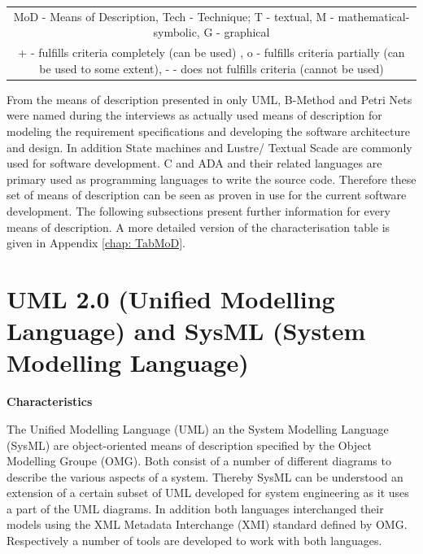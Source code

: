 \documentclass{./template/openetcs_report}
\begin{document}
\begin{center}
\begin{landscape}
\begin{table}[htp]
\begin{tabular}{|m{6cm}|m{0.8cm}|m{0.5cm}|m{0.8cm}|m{0.8cm}|m{0.8cm}|m{0.8cm}|m{0.8cm}|m{0.8cm}|m{0.5cm}||m{0.8cm}|m{1.5cm}|m{1.5cm}|m{2cm}|}
\multicolumn{14}{|c|}{MoD - Means of Description, Tech - Technique; T - textual, M - mathematical-symbolic, G - graphical} \\
\multicolumn{14}{|c|}{+ - fulfills criteria completely  (can be used) , o - fulfills criteria partially (can be used to some extent), - - does not fulfills criteria (cannot be used)} \\ \hline

\end{tabular}
\end{table}

   \end{landscape}
\end{center}


From the means of description presented in  \citeauthor{EN50128:2011}  only UML, B-Method and Petri Nets were named during the interviews as actually used means of description for modeling the requirement specifications and developing the software architecture and design. In addition State machines and Lustre/ Textual Scade are commonly used for software development. C and ADA and their related languages are primary used as programming languages to write the source code. Therefore these set of means of description can be seen as proven in use for the current software development. The following subsections present further information for every means of description. A more detailed version of the characterisation table is given in Appendix \ref{chap: TabMoD}.

\section{UML 2.0 (Unified Modelling Language) and SysML (System Modelling Language)}


	\textbf{Characteristics}

	The Unified Modelling Language (UML) an the System Modelling Language (SysML) are object-oriented means of description specified by the Object Modelling Groupe (OMG). Both consist of a number of different diagrams to describe the various aspects of a system. Thereby SysML can be understood an extension of a certain subset of UML developed for system engineering as it uses a part of the UML diagrams. In addition both languages interchanged their models using the XML Metadata Interchange (XMI) standard defined by OMG. Respectively a number of tools are developed to work with both languages.
\end{document}
